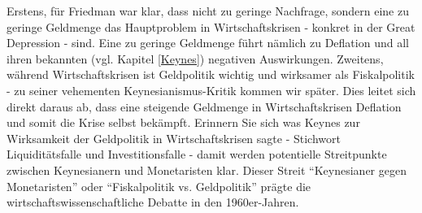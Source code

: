 Erstens, für Friedman war klar, dass nicht zu geringe Nachfrage, sondern eine zu geringe Geldmenge das Hauptproblem in Wirtschaftskrisen - konkret in der Great Depression - sind. Eine zu geringe Geldmenge führt nämlich zu Deflation und all ihren bekannten (vgl. Kapitel \ref{Keynes}) negativen Auswirkungen.
Zweitens, während Wirtschaftskrisen ist Geldpolitik wichtig und wirksamer als Fiskalpolitik - zu seiner vehementen Keynesianismus-Kritik kommen wir später. Dies leitet sich direkt daraus ab, dass eine steigende Geldmenge in Wirtschaftskrisen Deflation und somit die Krise selbst bekämpft. Erinnern Sie sich was Keynes zur Wirksamkeit der Geldpolitik in Wirtschaftskrisen sagte - Stichwort Liquiditätsfalle und Investitionsfalle - damit werden potentielle Streitpunkte zwischen Keynesianern und Monetaristen klar. Dieser Streit "`Keynesianer gegen Monetaristen"' oder "`Fiskalpolitik vs. Geldpolitik"' prägte die wirtschaftswissenschaftliche Debatte in den 1960er-Jahren. 

